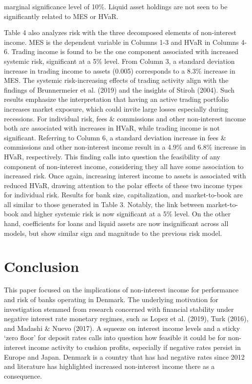 \documentclass[10pt]{article} %
\begin{document}
marginal significance level of 10\%. Liquid asset holdings are not seen to be significantly related to MES or HVaR.

Table 4 also analyzes risk with the three decomposed elements of non-interest income. MES is the dependent variable in Columns 1-3 and HVaR in Columns 4-6. Trading income is found to be the one component associated with increased systemic risk, significant at a 5\% level. From Column 3, a standard deviation increase in trading income to assets (0.005) corresponds to a 8.3\% increase in MES. The systemic risk-increasing effects of trading activity align with the findings of Brunnermeier et al. (2019) and the insights of Stiroh (2004). Such results emphasize the interpretation that having an active trading portfolio increases market exposure, which could invite large losses especially during recessions. For individual risk, fees \& commissions and other non-interest income both are associated with increases in HVaR, while trading income is not significant. Referring to Column 6, a standard deviation increase in fees \& commissions and other non-interest income result in a 4.9\% and 6.8\% increase in HVaR, respectively. This finding calls into question the feasibility of any component of non-interest income, considering they all have some association to increased risk. Once again, increasing interest income to assets is associated with reduced HVaR, drawing attention to the polar effects of these two income types for individual risk. Results for bank size, capitalization, and market-to-book are all similar to those generated in Table 3. Notably, the link between market-to-book and higher systemic risk is now significant at a 5\% level. On the other hand, coefficients for loans and liquid assets are now insignificant across all models, but show similar sign and magnitude to the previous risk model.  

\section{Conclusion}

This paper focused on the implications of non-interest income for performance and risk of banks operating in Denmark. The underlying motivation for investigation stemmed from research concerned with financial stability under negative interest rate monetary regimes, such as Lopez et al. (2019), Turk (2016), and Madashi \& Nuevo (2017). A squeeze on interest income levels and a sticky `zero floor' for deposit rates calls into question how feasible it could be for non-interest income activity to cushion profits, especially if negative rates persist in Europe and Japan. Denmark is a country that has had negative rates since 2012 and literature has highlighted increased non-interest income there as a consequence. 
\end{document}
